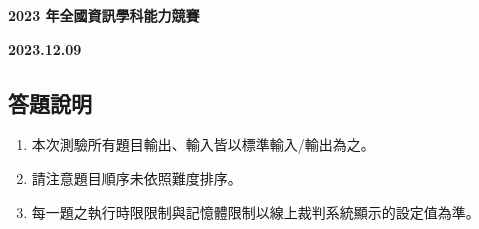 \thispagestyle{empty}
\setcounter{page}{-1}

\vspace*{4em}

\begin{center}
{\bfseries\Huge{2023 年全國資訊學科能力競賽}}\\
\end{center}
\begin{center}
{\bfseries\LARGE{2023.12.09}}
\end{center}

\vspace*{2em}
\subsection*{答題說明}

{\large
\begin{enumerate}
\item 本次測驗所有題目輸出、輸入皆以標準輸入/輸出為之。
\item 請注意題目順序未依照難度排序。
\item 每一題之執行時限限制與記憶體限制以線上裁判系統顯示的設定值為準。
\end{enumerate}
}

\vspace*{2em}
\begin{center}
\end{center}

\newpage

\thispagestyle{empty}
\EmptyPageHint{}
\newpage

